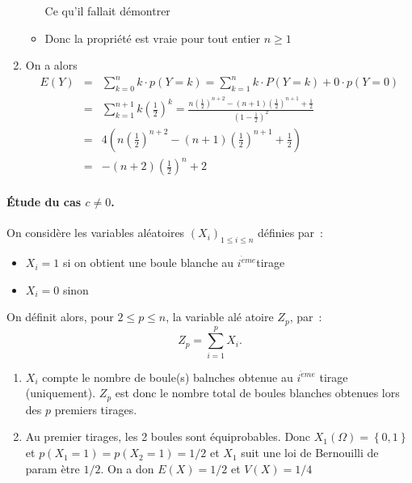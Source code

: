 \documentclass[a4paper, 11pt,reqno]{article}
\begin{document}
\begin{correction}
\begin{enumerate}
\begin{itemize}
Ce qu'il fallait d\'{e}montrer

\item Donc la propri\'{e}t\'{e} est vraie pour tout entier $n\ge 1$
\end{itemize}

\item On a alors 
\begin{eqnarray*}
E\left( Y\right) &=&\sum_{k=0}^{n}k\cdot p\left( Y=k\right)
=\sum_{k=1}^{n}k\cdot P(Y=k)+0\cdot p\left( Y=0\right) \\
&=&\sum_{k=1}^{n+1}k\left( \frac{1}{2}\right) ^{k}=\frac{n\left( \frac{1}{2}%
\right) ^{n+2}-(n+1)\left( \frac{1}{2}\right) ^{n+1}+\frac{1}{2}}{(1-\frac{1%
}{2})^{2}} \\
&=&4\left( n\left( \frac{1}{2}\right) ^{n+2}-(n+1)\left( \frac{1}{2}\right)
^{n+1}+\frac{1}{2}\right) \\
&=&-\left( n+2\right) \left( \frac{1}{2}\right) ^{n}+2
\end{eqnarray*}
\end{enumerate}

\paragraph{\'Etude du cas $c\neq 0$.}

On consid\`{e}re les variables al\'{e}atoires $\left( X_{i}\right)
_{1\leqslant i\leqslant n}$ d\'{e}finies par~:

\begin{itemize}
\item $X_{i}=1$ si on obtient une boule blanche au $i^{\grave{e}me}$tirage

\item $X_{i}=0$ sinon
\end{itemize}

On d\'{e}finit alors, pour $2\leqslant p\leqslant n$, la variable al\'{e}%
atoire $Z_{p}$, par~: 
\begin{equation*}
Z_{p}=\sum_{i=1}^{p}X_{i}.
\end{equation*}

\begin{enumerate}
\item $X_{i}$ compte le nombre de boule(s) balnches obtenue au $i^{\grave{e}%
me}$ tirage (uniquement). $Z_{p}$ est donc le nombre total de boules
blanches obtenues lors des $p$ premiers tirages.

\item Au premier tirages, les 2 boules sont \'{e}quiprobables. Donc $%
X_{1}\left( \Omega \right) =\left\{ 0,1\right\} $ et $p\left( X_{1}=1\right)
=p\left( X_{2}=1\right) =1/2$ et $X_{1}$ suit une loi de Bernouilli de param%
\`{e}tre $1/2.$ On a don $E\left( X\right) =1/2$ et $V\left( X\right) =1/4$


\end{enumerate}
\end{correction}
\end{document}

